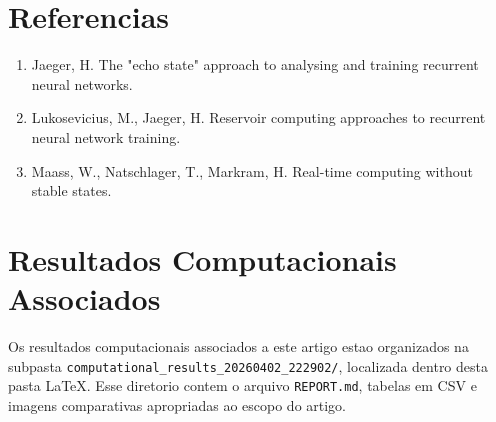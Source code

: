 \documentclass[12pt]{article}
\providecommand{\tightlist}{%
  \setlength{\itemsep}{0pt}\setlength{\parskip}{0pt}}
\begin{document}
\section{Referencias}\label{referencias}

\begin{enumerate}
\def\labelenumi{\arabic{enumi}.}
\tightlist
\item
  Jaeger, H. The "echo state" approach to analysing and training recurrent neural networks.
\item
  Lukosevicius, M., Jaeger, H. Reservoir computing approaches to recurrent neural network training.
\item
  Maass, W., Natschlager, T., Markram, H. Real-time computing without stable states.
\end{enumerate}

\section*{Resultados Computacionais Associados}

Os resultados computacionais associados a este artigo estao organizados na subpasta \texttt{computational\_results\_20260402\_222902/}, localizada dentro desta pasta \LaTeX. Esse diretorio contem o arquivo \texttt{REPORT.md}, tabelas em CSV e imagens comparativas apropriadas ao escopo do artigo.
\end{document}
